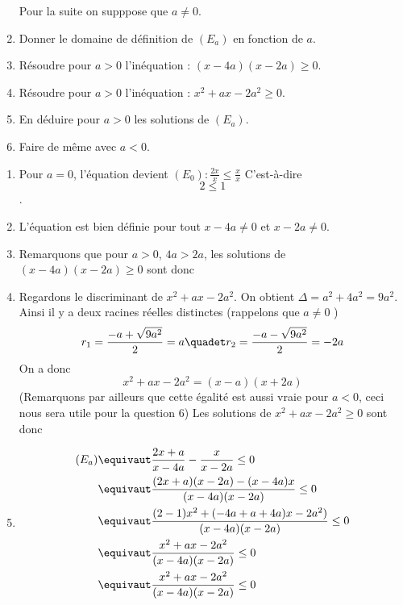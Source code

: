 \begin{correction}
\begin{exercice}
\begin{enumerate}
Pour la suite on supppose que $a\neq 0$.
\item Donner le domaine de définition de $(E_a)$ en fonction de $a$. 
\item Résoudre pour $a>0$ l'inéquation : $(x-4a)(x-2a)\geq 0$.
\item Résoudre pour $a>0$ l'inéquation : $x^2+ax-2a^2\geq 0$.
\item En déduire pour $a>0$ les solutions de $(E_a)$. 
\item Faire de même avec $a<0$. 
\end{enumerate}
\end{exercice}
\begin{correction}
\begin{enumerate}
\item Pour $a=0$, l'équation devient $(E_0)  : \frac{2x}{x} \leq \frac{x}{x}$ 
C'est-à-dire $$2\leq 1$$. 
\item L'équation est bien définie pour tout $x-4a \neq 0$ et $x -2a\neq 0$. 
\item Remarquons que pour $a>0$, $4a>2a$, les solutions de $(x-4a)(x-2a)\geq0$ sont donc 
\conclusion{ $S_1 = ]-\infty , 2a[ \cup ]4a, +\infty[$}
\item Regardons le discriminant de $x^2 +ax-2a^2 $. On obtient 
$\Delta = a^2 +4a^2 = 9a^2$.
Ainsi il y a deux racines réelles distinctes (rappelons que $a\neq 0$ ) 
$$r_1 = \frac{-a +\sqrt{9a^2}}{2} = a \quadet r_2  = \frac{-a -\sqrt{9a^2}}{2} = -2a$$
On  a donc $$x^2 +ax-2a^2  = (x-a)(x+2a)$$
(Remarquons par ailleurs que cette égalité est aussi vraie pour $a<0$, ceci nous sera utile pour la question 6) 
Les solutions  de $x^2 +ax-2a^2 \geq 0 $ sont donc 
\conclusion{ $] -\infty, -2a[\cup ]a, +\infty[$}
\item 
\begin{align*}
(E_a) \equivaut & \frac{2x+a}{x-4a} -\frac{x}{x-2a} \leq 0\\
		\equivaut & \frac{(2x+a)(x-2a) -(x-4a)x}{(x-4a)(x-2a)}\leq 0\\		
		\equivaut & \frac{(2-1)x^2+(-4a+a+4a)x -2a^2)}{(x-4a)(x-2a)}\leq 0\\		
		\equivaut & \frac{x^2+ax -2a^2}{(x-4a)(x-2a)}\leq 0	\\			
		\equivaut & \frac{x^2+ax -2a^2}{(x-4a)(x-2a)}\leq 0	
\end{align*}
  \begin{tikzpicture}


\end{tikzpicture}
\end{enumerate}
\end{correction}
\end{correction}
